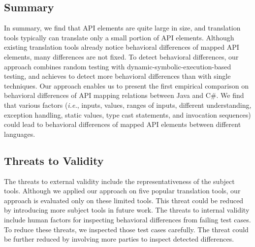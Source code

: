 \subsection{Summary}
\label{sec:evaluation:summary}
In summary, we find that API elements are quite large in size, and translation tools typically can translate only a small portion of API elements. Although existing translation tools already notice behavioral differences of mapped API elements, many differences are not fixed. To detect behavioral differences, our approach combines random testing with dynamic-symbolic-execution-based testing, and achieves to detect more behavioral differences than with single techniques. Our approach enables us to present the first empirical comparison on behavioral differences of API mapping relations between Java and C\#. We find that various factors (\emph{i.e.},  inputs,  values, ranges of inputs, different understanding, exception handling, static values, type cast statements, and invocation sequences) could lead to behavioral differences of mapped API elements between different languages.

\subsection{Threats to Validity}
\label{sec:evaluation:threat}
The threats to external validity include the representativeness of the subject tools. Although we applied
our approach on five popular translation tools, our approach is evaluated only on these limited tools. This threat could be reduced by introducing more subject tools in future work. The threats to internal validity include human factors for inspecting behavioral differences from failing test cases. To reduce these threats, we inspected those test cases carefully. The threat could be further reduced by involving more parties to inspect detected differences.
